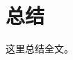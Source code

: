 \documentclass[12pt]{article} %
\begin{document}
\section{总结}
这里总结全文。




\newpage
\printbibliography
\end{document}
